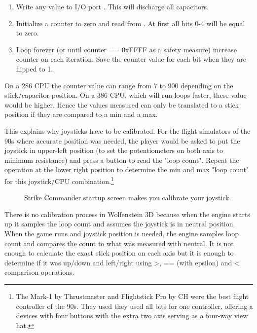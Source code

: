 \begin{enumerate}
 \item Write  any value to I/O port . This will discharge all capacitors.
 \item Initialize a counter to zero and read  from . At first all bits 0-4 will be equal to zero.
 \item Loop forever (or until counter == 0xFFFF as a safety measure) increase counter on each iteration. Save the counter value for each bit when they are flipped to 1.
\end{enumerate}
\par
On a 286 CPU the counter value can range from 7 to 900 depending on the stick/capacitor position. On a 386 CPU, which will run loops faster, these value would be higher. Hence the values measured can only be translated to a stick position if they are compared to a min and a max.\\
\par 
This explains why joysticks have to be calibrated. For the flight simulators of the 90s where accurate position was needed, the player would be asked to put the joystick in upper-left position (to set the potentiometers on both axis to minimum resistance) and press a button to read the "loop count". Repeat the operation at the lower right position to determine the min and max "loop count" for this joystick/CPU combination.\footnote{The Mark-1 by Thrustmaster and Flightstick Pro by CH were the best flight controller of the 90s. They used they used all bits for one controller, offering a devices with four buttons with the extra two axis serving as a four-way view hat.}\\
\par
\begin{figure}[H]
\centering
{}
\caption{Strike Commander startup screen makes you calibrate your joystick.}
\end{figure}
\par
There is no calibration process in Wolfenstein 3D because when the engine starts up it samples the loop count and assumes the joystick is in neutral position. When the game runs and joystick position is needed, the engine samples loop count and compares the count to what was measured with neutral. It is not enough to calculate the exact stick position on each axis but it is enough to determine if it was up/down and left/right using >, == (with epsilon) and < comparison operations.
